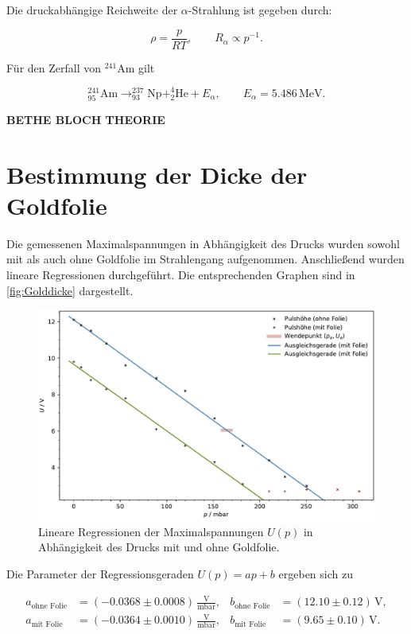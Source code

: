 Die druckabhängige Reichweite der $\alpha$-Strahlung ist gegeben durch:

\[
\rho = \frac{p}{RT}, \qquad R_\alpha \propto p^{-1}.
\]

Für den Zerfall von $^{241}\text{Am}$ gilt

\[
^{241}_{95}\text{Am} \rightarrow ^{237}_{93}\text{Np} + ^4_2\text{He} + E_\alpha, \qquad E_\alpha = 5.486 \, \text{MeV}.
\]

\textbf{BETHE BLOCH THEORIE}

\section*{Bestimmung der Dicke der Goldfolie}

Die gemessenen Maximalspannungen in Abhängigkeit des Drucks wurden sowohl mit als auch ohne Goldfolie im Strahlengang aufgenommen.  
Anschließend wurden lineare Regressionen durchgeführt. Die entsprechenden Graphen sind in \autoref{fig:Golddicke} dargestellt.

\begin{figure}[h!]
    \centering
    \includegraphics[width=1\textwidth]{content/messung/Golddicke.pdf}
    \caption{Lineare Regressionen der Maximalspannungen $U(p)$ in Abhängigkeit des Drucks mit und ohne Goldfolie.}
    \label{fig:Golddicke}
\end{figure}

Die Parameter der Regressionsgeraden $U(p) = ap + b$ ergeben sich zu

\begin{align*}
a_{\text{ohne Folie}} &= \left(-0.0368 \pm 0.0008\right) \, \frac{\text{V}}{\text{mbar}}, & b_{\text{ohne Folie}} &= \left(12.10 \pm 0.12\right) \, \text{V}, \\
a_{\text{mit Folie}} &= \left(-0.0364 \pm 0.0010\right) \, \frac{\text{V}}{\text{mbar}}, & b_{\text{mit Folie}} &= \left(9.65 \pm 0.10\right) \, \text{V}.
\end{align*}

